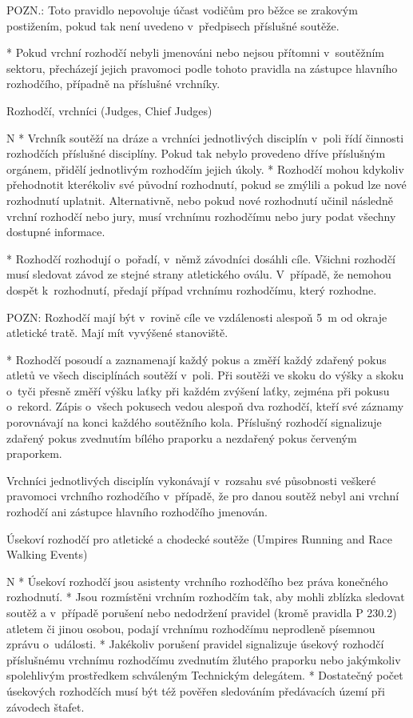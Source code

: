 POZN.: Toto pravidlo nepovoluje účast vodičům pro běžce se zrakovým postižením, pokud tak není uvedeno v~předpisech příslušné soutěže.

* Pokud vrchní rozhodčí nebyli jmenováni nebo nejsou přítomni v~soutěžním sektoru, přecházejí jejich pravomoci podle tohoto pravidla na zástupce hlavního rozhodčího, případně na příslušné vrchníky.
\enditems

\secc Rozhodčí, vrchníci (Judges, Chief Judges)

\begitems \style N
* Vrchník soutěží na dráze a vrchníci jednotlivých disciplín v~poli řídí činnosti rozhodčích příslušné disciplíny. Pokud tak nebylo provedeno dříve příslušným orgánem, přidělí jednotlivým rozhodčím jejich úkoly.
* Rozhodčí mohou kdykoliv přehodnotit kterékoliv své původní rozhodnutí, pokud se zmýlili a pokud lze nové rozhodnutí uplatnit. Alternativně, nebo pokud nové rozhodnutí učinil následně vrchní rozhodčí nebo jury, musí vrchnímu rozhodčímu nebo jury podat všechny dostupné informace.

* Rozhodčí rozhodují o~pořadí, v~němž závodníci dosáhli cíle. Všichni rozhodčí musí sledovat závod ze stejné strany atletického oválu. V~případě, že nemohou dospět k~rozhodnutí, předají případ vrchnímu rozhodčímu, který rozhodne.

POZN:  Rozhodčí mají být v~rovině cíle ve vzdálenosti alespoň 5~m od okraje atletické tratě. Mají mít vyvýšené stanoviště.

* Rozhodčí posoudí a zaznamenají každý pokus a změří každý zdařený pokus atletů ve všech disciplínách soutěží v~poli. Při soutěži ve skoku do výšky a skoku o~tyči přesně změří výšku laťky při každém zvýšení laťky, zejména při pokusu o~rekord. Zápis o~všech pokusech vedou alespoň dva rozhodčí, kteří své záznamy porovnávají na konci každého soutěžního kola. Příslušný rozhodčí signalizuje zdařený pokus zvednutím bílého praporku a nezdařený pokus červeným praporkem.

Vrchníci jednotlivých disciplín vykonávají v~rozsahu své působnosti veškeré pravomoci vrchního rozhodčího v~případě, že pro danou soutěž nebyl ani vrchní rozhodčí ani zástupce hlavního rozhodčího jmenován.
\enditems

\secc Úsekoví rozhodčí pro atletické a chodecké soutěže (Umpires Running and Race Walking Events)

\begitems \style N
* Úsekoví rozhodčí jsou asistenty vrchního rozhodčího bez práva konečného rozhodnutí.
* Jsou rozmístěni vrchním rozhodčím tak, aby mohli zblízka sledovat soutěž a v~případě porušení nebo nedodržení pravidel (kromě pravidla P 230.2) atletem či jinou osobou, podají vrchnímu rozhodčímu neprodleně písemnou zprávu o~události.
* Jakékoliv porušení pravidel signalizuje úsekový rozhodčí příslušnému vrchnímu rozhodčímu zvednutím žlutého praporku nebo jakýmkoliv spolehlivým prostředkem schváleným Technickým delegátem.
* Dostatečný počet úsekových rozhodčích musí být též pověřen sledováním předávacích území při závodech štafet.
\enditems

